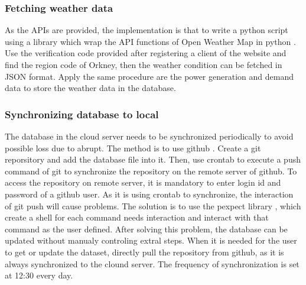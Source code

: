 \documentclass[12pt,a4paper]{report}
\begin{document}
                \subsubsection{Fetching weather data}
                As the APIs are provided, the implementation is that to write a python script using a library which wrap the API functions of Open Weather Map in python \cite{website:pyowm}.
                Use the verification code provided after registering a client of the website and find the region code of Orkney, then the weather condition can be fetched in JSON format. Apply
                the same procedure are the power generation and demand data to store the weather data in the database.

                \subsubsection{Synchronizing database to local} 
                The database in the cloud server needs to be synchronized periodically to avoid possible loss due to abrupt. The method is to use github \cite{website:github}. Create a git reporsitory \cite{website:git}
                and add the database file into it. Then, use crontab to execute a push command of git to synchronize the repository on the remote server of github. To access the repository on remote server, it is mandatory
                to enter login id and password of a github user. As it is using crontab to synchronize, the interaction of git push will cause problems. The solution is to use the pexpect library \cite{website:pexpect}, which
                create a shell for each command needs interaction and interact with that command as the user defined. After solving this problem, the database can be updated without manualy controling extral steps. When it is
                needed for the user to get or update the dataset, directly pull the repository from github, as it is always synchronized to the clound server. The frequency of synchronization is set at 12:30 every day.
\end{document}
